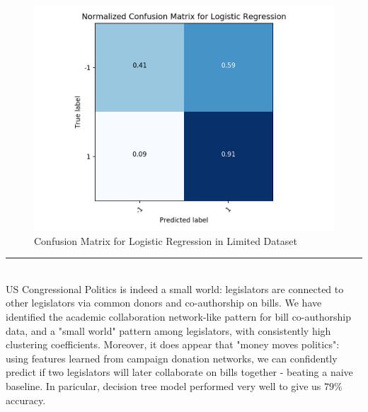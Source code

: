 \documentclass[a0]{a0poster}
\def\Head#1{\noindent{\LARGE\color{bluegray} #1}\bigskip}
\begin{document}
\begin{textblock}{7.0}
\begin{figure}
\begin{minipage}{0.48\linewidth}
\includegraphics[width=\linewidth]{logreg_limited}
\caption{Confusion Matrix for Logistic Regression in Limited Dataset}
\label{fig:logreg_limited}
 \end{minipage}
\end{figure}

\medskip
\hrule \medskip
\Head{Conclusion}\\
US Congressional Politics is indeed a small world: legislators are connected to other legislators via common donors and co-authorship on bills. We have identified the academic collaboration network-like pattern for bill co-authorship data, and a "small world" pattern among legislators, with consistently high clustering coefficients. Moreover, it does appear that "money moves politics": using features learned from campaign donation networks, we can confidently predict if two legislators will later collaborate on bills together - beating a naive baseline. In paricular, decision tree model performed very well to give us $79\%$ accuracy. 

\end{textblock}
\end{document}
